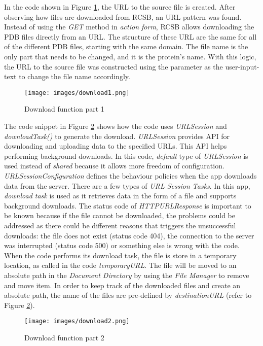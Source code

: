 In the code shown in Figure \ref{fig:download1}, the URL to the source file is created. After observing how files are downloaded from RCSB, an URL pattern was found. Instead of using the \emph{GET} method in \emph{action form}, RCSB allows downloading the PDB files directly from an URL. The structure of these URL are the same for all of the different PDB files, starting with the same domain. The file name is the only part that needs to be changed, and it is the protein's name. With this logic, the URL to the source file was constructed using the parameter as the user-input-text to change the file name accordingly. 
 \begin{figure}[!htp]
	\centering
	\texttt{[image: images/download1.png]}
	\caption{Download function part 1}
	\label{fig:download1}
\end{figure}

The code snippet in Figure \ref{fig:download2} shows how the code uses \emph{URLSession} and \emph{downloadTask()} to generate the download. \emph{URLSession} provides API for downloading and uploading data to the specified URLs. This API helps performing background downloads. In this code, \emph{default} type of \emph{URLSession} is used instead of \emph{shared} because it allows more freedom of configuration. \emph{URLSessionConfiguration} defines the behaviour policies when the app downloads data from the server. There are a few types of \emph{URL Session Tasks}. In this app, \emph{download task} is used as it retrieves data in the form of a file and supports background downloads. 
The status code of \emph{HTTPURLResponse} is important to be known because if the file cannot be downloaded, the problems could be addressed as there could be different reasons that triggers the unsuccessful downloads: the file does not exist (status code 404), the connection to the server was interrupted (status code 500) or something else is wrong with the code. 
When the code performs its download task, the file is store in a temporary location, as called in the code \emph{temporaryURL}. The file will be moved to an absolute path in the \emph{Document Directory} by using the \emph{File Manager} to remove and move item. In order to keep track of the downloaded files and create an absolute path, the name of the files are pre-defined by \emph{destinationURL} (refer to Figure \ref{fig:download2}). 


 \begin{figure}[!htp]
	\centering
	\texttt{[image: images/download2.png]}
	\caption{Download function part 2}
	\label{fig:download2}
\end{figure}



